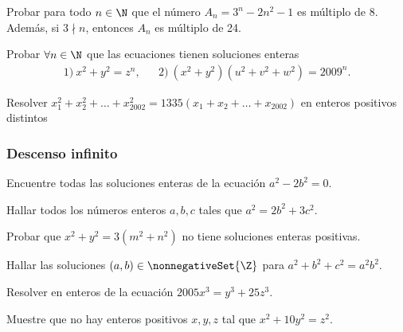 \begin{exercise}
    Probar para todo $n \in \N$ que el número $A_n = 3^n - 2n^2 - 1$ es múltiplo de $8$.
    Además, si $3\nmid n$, entonces $A_n$ es múltiplo de 24.
\end{exercise}

\begin{problem}
    Probar $\forall n \in \N$ que las ecuaciones tienen soluciones enteras
    \begin{align*}
        1)\ x^2 + y^2 = z^n, && 2)\ (x^2 + y^2)(u^2 + v^2 + w^2) = 2009^n.
    \end{align*}
\end{problem}

\begin{problem}
    Resolver $x_1^2 + x_2^2 + \dots + x_{2002}^2 = 1335\left(x_1 + x_2 + \dots + x_{2002}\right)$ en enteros positivos distintos
\end{problem}



\subsubsection{Descenso infinito}
\begin{exercise}
    Encuentre todas las soluciones enteras de la ecuación $a^2 - 2b^2 = 0$.
\end{exercise}

\begin{exercise}
    Hallar todos los números enteros $a,b,c$ tales que $a^2 = 2b^2 + 3c^2$.
\end{exercise}

\begin{exercise}
    Probar que $x^2 + y^2 = 3(m^2 + n^2)$ no tiene soluciones enteras positivas.
\end{exercise}

\begin{exercise}
    Hallar las soluciones $(a,b) \in \nonnegativeSet{\Z}$ para $a^2 + b^2 + c^2 = a^2 b^2$.
\end{exercise}

\begin{exercise}
    Resolver en enteros de la ecuación $2005x^3 = y^3 + 25z^3$.
\end{exercise}

\begin{exercise}
    Muestre que no hay enteros positivos $x,y,z$ tal que $x^2 + 10y^2 = z^2$.
\end{exercise}

